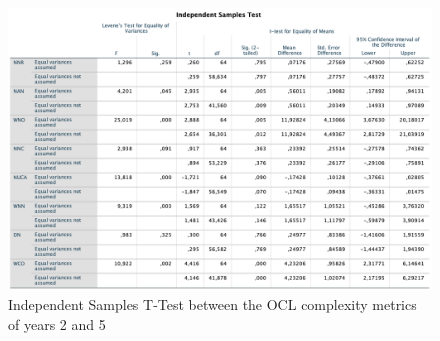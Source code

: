 \begin{figure}[ht]
\centering
\includegraphics[width=1\textwidth]{Template/Chapters/figures/6_Results/Section3/03_TTest_OCLMetrics.png}
\caption{Independent Samples T-Test between the OCL complexity metrics of years 2 and 5}
\label{fig:03_TTest_OCLMetrics}
\end{figure}


